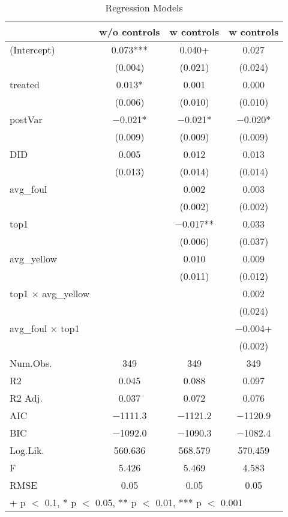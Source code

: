 \begin{table}

\caption{Regression Models}
\centering
\begin{tabular}[t]{lccc}
\toprule
  & w/o controls & w controls & w controls \\
\midrule
(Intercept) & \num{0.073}*** & \num{0.040}+ & \num{0.027}\\
 & (\num{0.004}) & (\num{0.021}) & (\num{0.024})\\
treated & \num{0.013}* & \num{0.001} & \num{0.000}\\
 & (\num{0.006}) & (\num{0.010}) & (\num{0.010})\\
postVar & \num{-0.021}* & \num{-0.021}* & \num{-0.020}*\\
 & (\num{0.009}) & (\num{0.009}) & (\num{0.009})\\
DID & \num{0.005} & \num{0.012} & \num{0.013}\\
 & (\num{0.013}) & (\num{0.014}) & (\num{0.014})\\
avg\_foul &  & \num{0.002} & \num{0.003}\\
 &  & (\num{0.002}) & (\num{0.002})\\
top1 &  & \num{-0.017}** & \num{0.033}\\
 &  & (\num{0.006}) & (\num{0.037})\\
avg\_yellow &  & \num{0.010} & \num{0.009}\\
 &  & (\num{0.011}) & (\num{0.012})\\
top1 × avg\_yellow &  &  & \num{0.002}\\
 &  &  & (\num{0.024})\\
avg\_foul × top1 &  &  & \num{-0.004}+\\
 &  &  & (\num{0.002})\\
\midrule
Num.Obs. & \num{349} & \num{349} & \num{349}\\
R2 & \num{0.045} & \num{0.088} & \num{0.097}\\
R2 Adj. & \num{0.037} & \num{0.072} & \num{0.076}\\
AIC & \num{-1111.3} & \num{-1121.2} & \num{-1120.9}\\
BIC & \num{-1092.0} & \num{-1090.3} & \num{-1082.4}\\
Log.Lik. & \num{560.636} & \num{568.579} & \num{570.459}\\
F & \num{5.426} & \num{5.469} & \num{4.583}\\
RMSE & \num{0.05} & \num{0.05} & \num{0.05}\\
\bottomrule
\multicolumn{4}{l}{\rule{0pt}{1em}+ p $<$ 0.1, * p $<$ 0.05, ** p $<$ 0.01, *** p $<$ 0.001}\\
\end{tabular}
\end{table}
